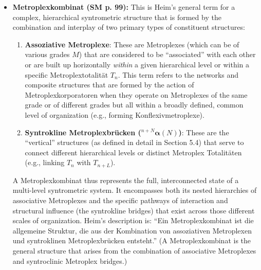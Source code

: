 \documentclass[12pt]{article}
\newcommand{\q}[1]{\enquote{#1}}
\def\metroplex#1#2{M}%
\newcommand{\metroplextotalitaet}[1]{T_{#1}}
\newcommand{\syntroklinebruecke}[1]{{}^{#1}\bm{\alpha}}
\begin{document}
\begin{itemize}
    \item \textbf{Metroplexkombinat (SM p. 99):}
    This is Heim's general term for a complex, hierarchical syntrometric structure that is formed by the combination and interplay of two primary types of constituent structures:
    \begin{enumerate}
        \item \textbf{Assoziative Metroplexe}: These are Metroplexes (which can be of various grades \( \metroplex{k}{} \)) that are considered to be \q{associated} with each other or are built up horizontally \textit{within} a given hierarchical level or within a specific Metroplextotalität \( \metroplextotalitaet{n} \). This term refers to the networks and composite structures that are formed by the action of Metroplexkorporatoren when they operate on Metroplexes of the same grade or of different grades but all within a broadly defined, common level of organization (e.g., forming Konflexivmetroplexe).
        \item \textbf{Syntrokline Metroplexbrücken (\( \syntroklinebruecke{n+N}(N) \))}: These are the \q{vertical} structures (as defined in detail in Section 5.4) that serve to connect different hierarchical levels or distinct Metroplex Totalitäten (e.g., linking \( \metroplextotalitaet{n} \) with \( \metroplextotalitaet{n+L} \)).
    \end{enumerate}
    A Metroplexkombinat thus represents the full, interconnected state of a multi-level syntrometric system. It encompasses both its nested hierarchies of associative Metroplexes and the specific pathways of interaction and structural influence (the syntrokline bridges) that exist across those different scales of organization. Heim's description is: \q{Ein Metroplexkombinat ist die allgemeine Struktur, die aus der Kombination von assoziativen Metroplexen und syntroklinen Metroplexbrücken entsteht.} (A Metroplexkombinat is the general structure that arises from the combination of associative Metroplexes and syntroclinic Metroplex bridges.)


\end{itemize}
\end{document}
